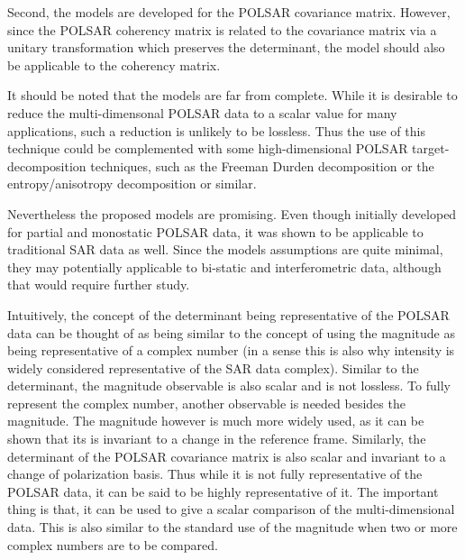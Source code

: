 \documentclass[journal]{IEEEtran}
\begin{document}
Second, the models are developed for the POLSAR covariance matrix.
However, since the POLSAR coherency matrix is related to the covariance matrix via a unitary transformation which preserves the determinant,
  the model should also be applicable to the coherency matrix.

It should be noted that the models are far from complete.
While it is desirable to reduce the multi-dimensonal POLSAR data to a scalar value for many applications,
  such a reduction is unlikely to be lossless.  
Thus %
the use of this technique could be complemented with some high-dimensional POLSAR target-decomposition techniques, such as the Freeman Durden decomposition \cite{Freeman_1998_TGRS_963} or the entropy/anisotropy decomposition \cite{Cloude_1997_TGRS_68} or similar.

Nevertheless the proposed models are promising.
Even though initially developed for partial and monostatic POLSAR data,
  it was shown to be applicable to traditional SAR data as well.
Since the models assumptions are quite minimal, they may potentially applicable to bi-static and interferometric data, although that would require further study.

Intuitively, the concept of the determinant being representative of the POLSAR data can be thought of as being similar to the concept of using the magnitude as being representative of a complex number
(in a sense this is also why intensity is widely considered representative of the SAR data complex).
Similar to the determinant, the magnitude observable is also scalar and is not lossless.
To fully represent the complex number, another observable is needed besides the magnitude.
The magnitude however is much more widely used, as it can be shown that its is invariant to a change in the reference frame.
Similarly, the determinant of the POLSAR covariance matrix is also scalar and invariant to a change of polarization basis.
Thus while it is not fully representative of the POLSAR data, it can be said to be highly representative of it.
The important thing is that, it can be used to give a scalar comparison of the multi-dimensional data.
This is also similar to the standard use of the magnitude when two or more complex numbers are to be compared. %
\end{document}

